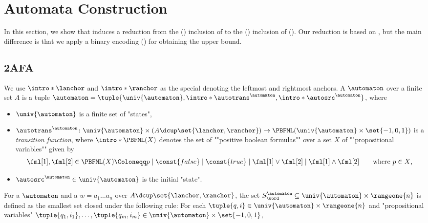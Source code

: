\section{Automata Construction} \label{section: automata construction}
In this section, 
we show that 
induces a reduction
from the () inclusion of 
to the () inclusion of  ().
Our reduction is based on \cite[\S 5.3]{nakamuraDerivativesGraphsPositive2025},
but the main difference is that we apply a binary encoding () for obtaining the  upper bound.

%
%

\subsection{2AFA}
\AP
We use $\intro*\lanchor$ and $\intro*\ranchor$ as the special  denoting the leftmost and rightmost anchors.
%
A \intro*{} $\automaton$ over a finite set $A$ is a tuple $\automaton = \tuple{\univ{\automaton}, \intro*\autotrans^{\automaton}, \intro*\autosrc^{\automaton}}$, where 
\begin{itemize}
    \item $\univ{\automaton}$ is a finite set of "states",
    \item \AP $\autotrans^{\automaton} \colon \univ{\automaton} \times (A \dcup \set{\lanchor, \ranchor}) \to \PBFML(\univ{\automaton} \times \set{-1, 0, 1})$ is a \emph{transition function},
    where $\intro*\PBFML(X)$ denotes the set of ""positive boolean formulas"" over a set $X$ of ""propositional variables"" given by
    \begin{align*}
        \fml[1], \fml[2] \in \PBFML(X) \Coloneqq p \mid \const{false} \mid \const{true} \mid \fml[1] \lor \fml[2] \mid \fml[1] \land \fml[2] \tag*{where $p \in X$,}
    \end{align*}
\item $\autosrc^{\automaton} \in \univ{\automaton}$ is the initial "state".
\end{itemize}
For a  $\automaton$ and a  $w = a_{1} \dots a_{n}$ over $A \dcup \set{\lanchor, \ranchor}$,
the set $S^{\automaton}_{\word} \subseteq \univ{\automaton} \times \rangeone{n}$ is defined as
the smallest set closed under the following rule:
    For each $\tuple{q, i} \in \univ{\automaton} \times \rangeone{n}$
    and "propositional variables" $\tuple{q_1, i_1}, \dots, \tuple{q_{m}, i_{m}} \in \univ{\automaton} \times \set{-1, 0, 1}$,
